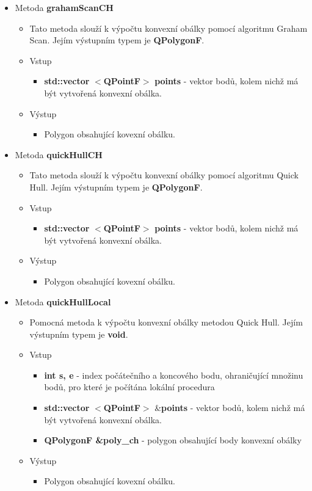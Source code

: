 \documentclass[a4paper, 12pt]{article}
\begin{document}
\begin{itemize}
	\item Metoda \textbf{grahamScanCH}
		\begin{itemize}
			\item Tato metoda slouží k výpočtu konvexní obálky pomocí algoritmu Graham Scan. Jejím výstupním typem je \textbf{QPolygonF}.
			\item Vstup
				\begin{itemize}
					\item \textbf{std::vector} $<$\textbf{QPointF}$>$ \textbf{points} - vektor bodů, kolem nichž má být vytvořená konvexní obálka.
				\end{itemize}
			\item Výstup
				\begin{itemize}
					\item Polygon obsahující kovexní obálku.
				\end{itemize} 
		\end{itemize}

	\item Metoda \textbf{quickHullCH}
		\begin{itemize}
			\item Tato metoda slouží k výpočtu konvexní obálky pomocí algoritmu Quick Hull. Jejím výstupním typem je \textbf{QPolygonF}.
			\item Vstup
				\begin{itemize}
					\item \textbf{std::vector} $<$\textbf{QPointF}$>$ \textbf{points} - vektor bodů, kolem nichž má být vytvořená konvexní obálka.
				\end{itemize}
			\item Výstup
				\begin{itemize}
					\item Polygon obsahující kovexní obálku.
				\end{itemize} 
		\end{itemize}

	\item Metoda \textbf{quickHullLocal}
		\begin{itemize}
			\item Pomocná metoda k výpočtu konvexní obálky metodou Quick Hull. Jejím výstupním typem je \textbf{void}.
			\item Vstup
				\begin{itemize}
					\item \textbf{int s, e} - index počátečního a koncového bodu, ohraničující množinu bodů, pro které je počítána lokální procedura
					\item \textbf{std::vector} $<$\textbf{QPointF}$>$ \&\textbf{points} - vektor bodů, kolem nichž má být vytvořená konvexní obálka.
					\item \textbf{QPolygonF \&poly\_ch} - polygon obsahující body konvexní obálky
				\end{itemize}
			\item Výstup
				\begin{itemize}
					\item Polygon obsahující kovexní obálku.
				\end{itemize} 
		\end{itemize}


\end{itemize}
\end{document}
